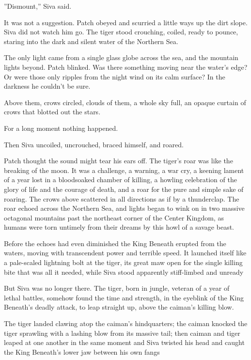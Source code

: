 \documentclass[12pt]{book}
\begin{document}
 ''Dismount,'' Siva said.\par
 It was not a suggestion. Patch obeyed and scurried a little ways up the dirt slope. Siva did not watch him go. The tiger stood crouching, coiled, ready to pounce, staring into the dark and silent water of the Northern Sea.\par
The only light came from a single glass globe across the sea, and the mountain lights beyond. Patch blinked. Was there something moving near the water's edge? Or were those only ripples from the night wind on its calm surface? In the darkness he couldn't be sure.\par
Above them, crows circled, clouds of them, a whole sky full, an opaque curtain of crows that blotted out the stars.\par
 For a long moment nothing happened.\par
 Then Siva uncoiled, uncrouched, braced himself, and roared.\par
 Patch thought the sound might tear his ears off. The tiger's roar was like the breaking of the moon. It was a challenge, a warning, a war cry, a keening lament of a year lost in a bloodsoaked chamber of killing, a howling celebration of the glory of life and the courage of death, and a roar for the pure and simple sake of roaring. The crows above scattered in all directions as if by a thunderclap. The roar echoed across the Northern Sea, and lights began to wink on in two massive octagonal mountains past the northeast corner of the Center Kingdom, as humans were torn untimely from their dreams by this howl of a savage beast.\par
 Before the echoes had even diminished the King Beneath erupted from the waters, moving with transcendent power and terrible speed. It launched itself like a pale-scaled lightning bolt at the tiger, its great maw open for the single killing bite that was all it needed, while Siva stood apparently stiff-limbed and unready %
\par
But Siva was no longer there. The tiger, born in jungle, veteran of a year of lethal battles, somehow found the time and strength, in the eyeblink of the King Beneath's deadly attack, to leap straight up, above the caiman's killing blow.\par
The tiger landed clawing atop the caiman's hindquarters; the caiman knocked the tiger sprawling with a lashing blow from its massive tail; then caiman and tiger leaped at one another in the same moment %
 and Siva twisted his head and caught the King Beneath's lower jaw between his own fangs %
\end{document}
